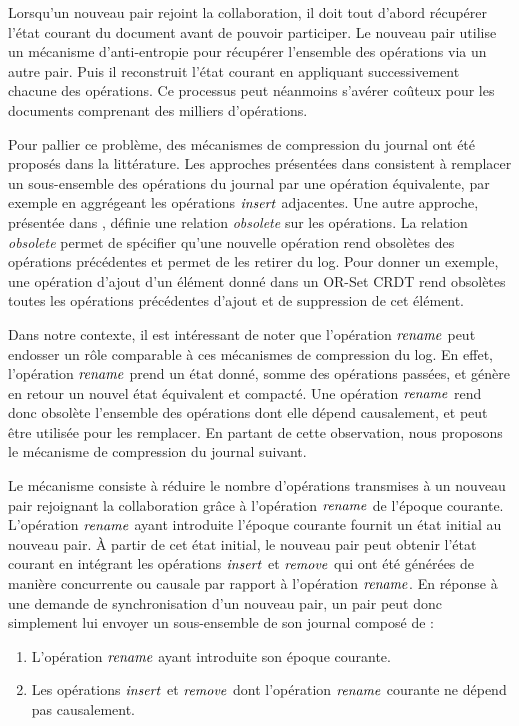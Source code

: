 Lorsqu'un nouveau pair rejoint la collaboration, il doit tout d'abord récupérer l'état courant du document avant de pouvoir participer.
Le nouveau pair utilise un mécanisme d'anti-entropie \cite{1983-anti-entropy-vv} pour récupérer l'ensemble des opérations via un autre pair.
Puis il reconstruit l'état courant en appliquant successivement chacune des opérations.
Ce processus peut néanmoins s'avérer coûteux pour les documents comprenant des milliers d'opérations.

Pour pallier ce problème, des mécanismes de compression du journal ont été proposés dans la littérature.
Les approches présentées dans \cite{2002-log-compression-op-based-vcs-shen-sun, 2006-these-claudia} consistent à remplacer un sous-ensemble des opérations du journal par une opération équivalente, par exemple en aggrégeant les opérations $\mathit{insert}$ adjacentes.
Une autre approche, présentée dans \cite{2014-making-op-based-crdts-op-based}, définie une relation \emph{obsolete} sur les opérations.
La relation \emph{obsolete} permet de spécifier qu'une nouvelle opération rend obsolètes des opérations précédentes et permet de les retirer du log.
Pour donner un exemple, une opération d'ajout d'un élément donné dans un OR-Set \ac{CRDT} rend obsolètes toutes les opérations précédentes d'ajout et de suppression de cet élément.

Dans notre contexte, il est intéressant de noter que l'opération $\mathit{rename}$ peut endosser un rôle comparable à ces mécanismes de compression du log.
En effet, l'opération $\mathit{rename}$ prend un état donné, somme des opérations passées, et génère en retour un nouvel état équivalent et compacté.
Une opération $\mathit{rename}$ rend donc obsolète l'ensemble des opérations dont elle dépend causalement, et peut être utilisée pour les remplacer.
En partant de cette observation, nous proposons le mécanisme de compression du journal suivant.

Le mécanisme consiste à réduire le nombre d'opérations transmises à un nouveau pair rejoignant la collaboration grâce à l'opération $\mathit{rename}$ de l'époque courante.
L'opération $\mathit{rename}$ ayant introduite l'époque courante fournit un état initial au nouveau pair.
À partir de cet état initial, le nouveau pair peut obtenir l'état courant en intégrant les opérations $\mathit{insert}$ et $\mathit{remove}$ qui ont été générées de manière concurrente ou causale par rapport à l'opération $\mathit{rename}$.
En réponse à une demande de synchronisation d'un nouveau pair, un pair peut donc simplement lui envoyer un sous-ensemble de son journal composé de :
\begin{enumerate}
  \item L'opération $\mathit{rename}$ ayant introduite son époque courante.
  \item Les opérations $\mathit{insert}$ et $\mathit{remove}$ dont l'opération $\mathit{rename}$ courante ne dépend pas causalement.
\end{enumerate}

